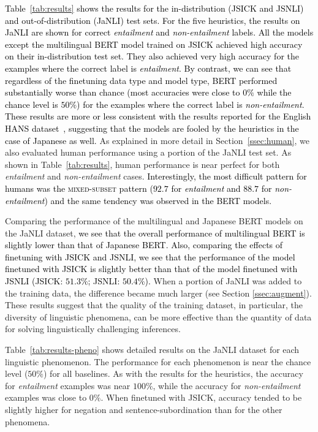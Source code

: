 \documentclass[11pt]{article}
\newcommand{\km}[1]{\textcolor{black}{#1}}
\begin{document}
\km{Table~\ref{tab:results} shows the results for the in-distribution (JSICK and JSNLI)
and out-of-distribution (JaNLI) test sets.
For the five heuristics, the results on JaNLI
are shown for correct \textit{entailment} and \textit{non-entailment} labels.
All the models except the multilingual BERT model trained on JSICK
achieved high accuracy on their in-distribution test set.
They also achieved very high accuracy for the examples where the correct label is
\textit{entailment}.
By contrast, we can see that regardless of the finetuning data type and model type, BERT performed substantially worse than chance 
(most accuracies were close to $0\%$
while the chance level is $50\%$)
for the examples where the correct label is \textit{non-entailment}.
These results are more or less consistent with the results reported
for the English HANS dataset~\cite{mccoy-etal-2019-right},
suggesting that the models are fooled by the heuristics in
the case of Japanese as well.}
As explained in more detail in Section~\ref{ssec:human},
we also evaluated human performance using a portion of the JaNLI test set.
As shown in Table~\ref{tab:results},
human performance is near perfect for both \textit{entailment} and
\textit{non-entailment} cases.
\km{Interestingly, the most difficult pattern for humans
was the \textsc{mixed-subset} pattern
($92.7$ for \textit{entailment} and $88.7$ for \textit{non-entailment})
and the same tendency was observed in the BERT models.}

Comparing the performance of the multilingual and Japanese BERT models on
the JaNLI dataset,
\km{we see that the overall performance of multilingual BERT is slightly lower than
that of Japanese BERT.}
\km{Also, comparing the effects of finetuning with
JSICK and JSNLI,
we see that the performance of the model finetuned with JSICK is slightly better than that of the model finetuned with JSNLI (JSICK: $51.3\%$; JSNLI: $50.4\%$).}
When a portion of JaNLI was added to the training data,
the difference became much larger (see Section \ref{ssec:augment}).
These results suggest that the quality of the training dataset,
in particular, the diversity of linguistic phenomena,
can be more effective than the quantity of data
for solving linguistically challenging inferences.

Table~\ref{tab:results-pheno} shows detailed results on the JaNLI dataset
for each linguistic phenomenon.
The performance for each phenomenon is near the chance level ($50\%$) for all baselines.
As with the results for the heuristics, the accuracy for \textit{entailment} examples was near $100\%$, while the accuracy for \textit{non-entailment} examples
was close to $0\%$.
When finetuned with JSICK, accuracy tended to be slightly higher for negation and sentence-subordination than for the other phenomena.
\end{document}
